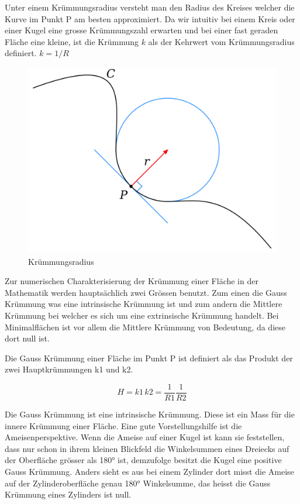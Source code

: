 \begin{refsection}
Unter einem Krümmungsradius versteht man den Radius des Kreises welcher die Kurve im Punkt P am besten approximiert. 
Da wir intuitiv bei einem Kreis oder einer Kugel eine grosse Krümmungszahl erwarten und bei einer fast geraden Fläche eine kleine, ist die Krümmung $k$  als der Kehrwert vom Krümmungsradius definiert. $k=1/R$ 

\begin{figure} [H]
  \centering
  \includegraphics[scale=0.1]{minimal/Kruemmungsradius.png}
  \caption{Krümmungsradius} 
\end{figure}


Zur numerischen Charakterisierung der Krümmung einer Fläche in der Mathematik werden hauptsächlich zwei Grössen benutzt.
Zum einen die Gauss Krümmung was eine intrinsische Krümmung ist und zum andern die Mittlere Krümmung bei welcher es sich um eine extrinsische Krümmung handelt. Bei Minimalflächen ist vor allem die Mittlere Krümmung von Bedeutung, da diese dort null ist.


Die Gauss Krümmung einer Fläche im Punkt P ist definiert als das Produkt der zwei Hauptkrümmungen k1 und k2.

\begin{equation} \label{Gauss_Kruemmung_D}
  H=k1\, k2= \frac{1}{R1}\frac{1}{R2}
\end{equation}



Die Gauss Krümmung ist eine intrinsische Krümmung. Diese ist  ein Mass für die innere Krümmung einer Fläche. 
Eine gute Vorstellungshilfe ist die Ameisenperspektive. 
Wenn die Ameise auf einer Kugel ist kann sie feststellen, dass nur schon in ihrem kleinen Blickfeld die Winkelsummen eines Dreiecks auf der Oberfläche grösser als 180° ist, demzufolge besitzt die Kugel eine positive Gauss Krümmung. Anders sieht es aus bei einem Zylinder dort misst die Ameise auf der Zylinderoberfläche genau 180° Winkelsumme, das heisst die Gauss Krümmung eines Zylinders ist null.


\end{refsection}
